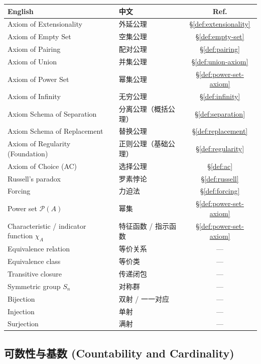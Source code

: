 \documentclass{article}
\begin{document}
\begin{tabular}{@{}lp{7.5cm}c@{}}
  \hline
  \textbf{English} & \textbf{中文} & \textbf{Ref.} \\
  \hline
  Axiom of Extensionality          & 外延公理 & \S\ref{def:extensionality} \\
  Axiom of Empty Set               & 空集公理 & \S\ref{def:empty-set} \\
  Axiom of Pairing                 & 配对公理 & \S\ref{def:pairing} \\
  Axiom of Union                   & 并集公理 & \S\ref{def:union-axiom} \\
  Axiom of Power Set               & 幂集公理 & \S\ref{def:power-set-axiom} \\
  Axiom of Infinity                & 无穷公理 & \S\ref{def:infinity} \\
  Axiom Schema of Separation       & 分离公理（概括公理）& \S\ref{def:separation} \\
  Axiom Schema of Replacement      & 替换公理 & \S\ref{def:replacement} \\
  Axiom of Regularity (Foundation) & 正则公理（基础公理）& \S\ref{def:regularity} \\
  Axiom of Choice (AC)             & 选择公理 & \S\ref{def:ac} \\
  Russell's paradox                & 罗素悖论 & \S\ref{def:russell} \\
  Forcing                          & 力迫法 & \S\ref{def:forcing} \\
  Power set $\mathcal{P}(A)$       & 幂集 & \S\ref{def:power-set-axiom} \\
  Characteristic / indicator function $\chi_A$ & 特征函数 / 指示函数 &
  \S\ref{def:power-set-axiom} \\
  Equivalence relation             & 等价关系 & --- \\
  Equivalence class                & 等价类 & --- \\
  Transitive closure               & 传递闭包 & --- \\
  Symmetric group $S_n$            & 对称群 & --- \\
  Bijection                        & 双射 / 一一对应 & --- \\
  Injection                        & 单射 & --- \\
  Surjection                       & 满射 & --- \\
  \hline
\end{tabular}

\subsection*{可数性与基数 (Countability and Cardinality)}
\end{document}
